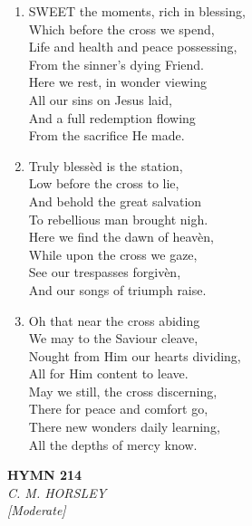 \begin{enumerate}
    \item SWEET the moments, rich in blessing, \\
            Which before the cross we spend, \\
        Life and health and peace possessing, \\
            From the sinner's dying Friend. \\
        Here we rest, in wonder viewing \\
            All our sins on Jesus laid, \\
        And a full redemption flowing \\
            From the sacrifice He made.

    \item Truly bless\`ed is the station, \\
            Low before the cross to lie, \\
        And behold the great salvation \\
            To rebellious man brought nigh. \\
        Here we find the dawn of heav\`en, \\
            While upon the cross we gaze, \\
        See our trespasses forgiv\`en, \\
            And our songs of triumph raise.

    \item Oh that near the cross abiding \\
            We may to the Saviour cleave, \\
        Nought from Him our hearts dividing, \\
            All for Him content to leave. \\
        May we still, the cross discerning, \\
            There for peace and comfort go, \\
        There new wonders daily learning, \\
            All the depths of mercy know.

\end{enumerate}

\newpage
\begin{center}
    {\Large \textbf{HYMN 214}}
    \\
    \textit{C. M. HORSLEY}
    \\
    \textit{\small [Moderate]}
\end{center}
\vspace{1em}

